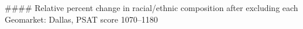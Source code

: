 #### Relative percent change in racial/ethnic composition after excluding each Geomarket: Dallas, PSAT score 1070–1180

